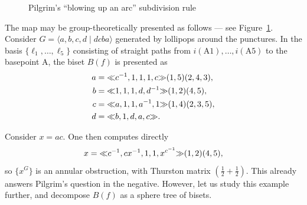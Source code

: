 \documentclass{amsart}
\begin{document}
\begin{figure}
\begin{center}
\end{center}
\caption{Pilgrim's ``blowing up an arc'' subdivision rule}\label{fig:pilgrimmap}
\end{figure}

The map may be group-theoretically presented as follows --- see
Figure~\ref{fig:pilgrimmap}. Consider
$G=\langle a,b,c,d\mid d c b a\rangle$ generated by lollipops around the
punctures. In the basis
$\{\ell_1,\dots,\ell_5\}$ consisting of straight paths from
$i(\mathrm{A1}),\dots,i(\mathrm{A5})$ to the basepoint $\mathrm{A}$,
the biset $B(f)$ is presented as
\begin{align*}
  a &= {\ll}c^{-1},1,1,1,c{\gg}(1,5)(2,4,3),\\
  b &= {\ll}1,1,1,d,d^{-1}{\gg}(1,2)(4,5),\\
  c &= {\ll}a,1,1,a^{-1},1{\gg}(1,4)(2,3,5),\\
  d &= {\ll}b,1,d,a,c{\gg}.
\end{align*}

\noindent Consider $x=ac$. One then computes directly
\[x={\ll}c^{-1},c x^{-1},1,1,x^{c^{-1}}{\gg}(1,2)(4,5),\]
so $\{x^G\}$ is an annular obstruction, with Thurston matrix
$(\frac12+\frac12)$. This already answers Pilgrim's question in the
negative. However, let us study this example further, and decompose
$B(f)$ as a sphere tree of bisets.
\end{document}
